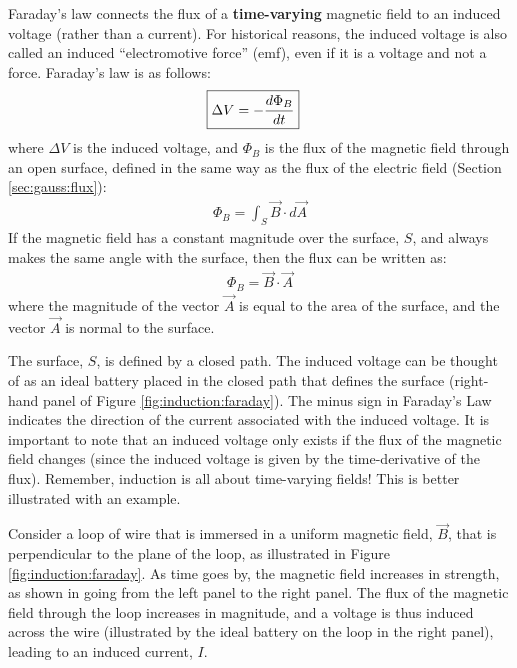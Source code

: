 Faraday's law connects the flux of a \textbf{time-varying} magnetic field to an induced voltage (rather than a current). For historical reasons, the induced voltage is also called an induced ``electromotive force'' (emf), even if it is a voltage and not a force. Faraday's law is as follows:
\begin{align*}
\Aboxed{\Delta V = -\frac{d\Phi_B}{dt}}
\end{align*}
where $\Delta V$ is the induced voltage, and  $\Phi_B$ is the flux of the magnetic field through an open surface, defined in the same way as the flux of the electric field (Section \ref{sec:gauss:flux}):
\begin{align*}
\Phi_B = \int_S \vec B\cdot d\vec A
\end{align*}
If the magnetic field has a constant magnitude over the surface, $S$, and always makes the same angle with the surface, then the flux can be written as:
\begin{align*}
\Phi_B =  \vec B\cdot\vec A
\end{align*}
where the magnitude of the vector $\vec A$ is equal to the area of the surface, and the vector $\vec A$ is normal to the surface.

The surface, $S$, is defined by a closed path. The induced voltage can be thought of as an ideal battery placed in the closed path that defines the surface (right-hand panel of Figure \ref{fig:induction:faraday}). The minus sign in Faraday's Law indicates the direction of the current associated with the induced voltage. It is important to note that an induced voltage only exists if the flux of the magnetic field changes (since the induced voltage is given by the time-derivative of the flux). Remember, induction is all about time-varying fields! This is better illustrated with an example.

Consider a loop of wire that is immersed in a uniform magnetic field, $\vec B$, that is perpendicular to the plane of the loop, as illustrated in Figure \ref{fig:induction:faraday}. As time goes by, the magnetic field increases in strength, as shown in going from the left panel to the right panel. The flux of the magnetic field through the loop increases in magnitude, and a voltage is thus induced across the wire (illustrated by the ideal battery on the loop in the right panel), leading to an induced current, $I$.

